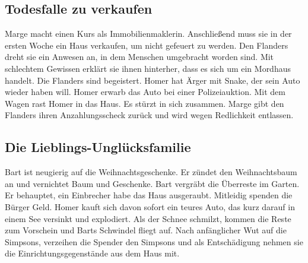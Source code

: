 \subsection{Todesfalle zu verkaufen}\label{5F06}
Marge macht einen Kurs als Immobilienmaklerin. Anschließend muss sie in der ersten Woche ein Haus verkaufen, um nicht gefeuert zu werden. Den Flanders dreht sie ein Anwesen an, in dem Menschen umgebracht worden sind. Mit schlechtem Gewissen erklärt sie ihnen hinterher, dass es sich um ein Mordhaus handelt. Die Flanders sind begeistert. Homer hat Ärger mit Snake, der sein Auto wieder haben will. Homer erwarb das Auto bei einer Polizeiauktion. Mit dem Wagen rast Homer in das Haus. Es stürzt in sich zusammen. Marge gibt den Flanders ihren Anzahlungsscheck zurück und wird wegen Redlichkeit entlassen.

	
\subsection{Die Lieblings-Unglücksfamilie}\label{5F07}
Bart ist neugierig auf die Weihnachtsgeschenke. Er zündet den Weihnachtsbaum an und vernichtet Baum und Geschenke. Bart vergräbt die Überreste im Garten. Er behauptet, ein Einbrecher habe das Haus ausgeraubt. Mitleidig spenden die Bürger Geld. Homer kauft sich davon sofort ein teures Auto, das kurz darauf in einem See versinkt und explodiert. Als der Schnee schmilzt, kommen die Reste zum Vorschein und Barts Schwindel fliegt auf. Nach anfänglicher Wut auf die Simpsons, verzeihen die Spender den Simpsons und als Entschädigung nehmen sie die Einrichtungsgegenstände aus dem Haus mit.

